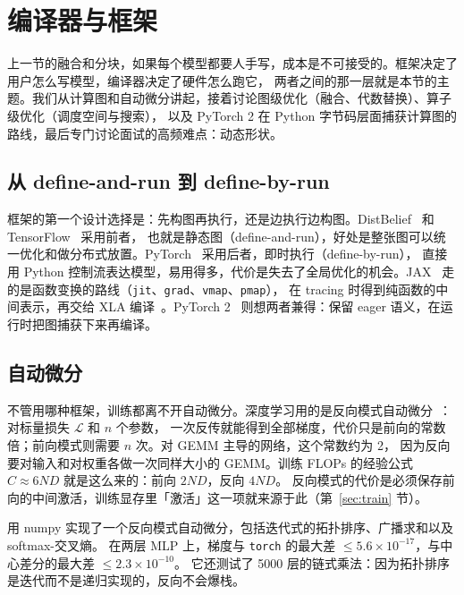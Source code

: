 \section{编译器与框架}
\label{sec:compiler}

上一节的融合和分块，如果每个模型都要人手写，成本是不可接受的。框架决定了用户怎么写模型，编译器决定了硬件怎么跑它，
两者之间的那一层就是本节的主题。我们从计算图和自动微分讲起，接着讨论图级优化（融合、代数替换）、算子级优化（调度空间与搜索），
以及 PyTorch 2 在 Python 字节码层面捕获计算图的路线，最后专门讨论面试的高频难点：动态形状。

\subsection{从 define-and-run 到 define-by-run}

框架的第一个设计选择是：先构图再执行，还是边执行边构图。DistBelief~\cite{dean2012large} 和 TensorFlow~\cite{abadi2016tensorflow} 采用前者，
也就是静态图（define-and-run），好处是整张图可以统一优化和做分布式放置。PyTorch~\cite{paszke2019pytorch} 采用后者，即时执行（define-by-run），
直接用 Python 控制流表达模型，易用得多，代价是失去了全局优化的机会。JAX~\cite{jax2018github} 走的是函数变换的路线（\texttt{jit}、\texttt{grad}、\texttt{vmap}、\texttt{pmap}），
在 tracing 时得到纯函数的中间表示，再交给 XLA 编译~\cite{xla}。PyTorch 2~\cite{ansel2024pytorch2} 则想两者兼得：保留 eager 语义，在运行时把图捕获下来再编译。

\subsection{自动微分}

不管用哪种框架，训练都离不开自动微分。深度学习用的是反向模式自动微分~\cite{baydin2018automatic}：对标量损失 $\mathcal{L}$ 和 $n$ 个参数，
一次反传就能得到全部梯度，代价只是前向的常数倍；前向模式则需要 $n$ 次。对 GEMM 主导的网络，这个常数约为 2，
因为反向要对输入和对权重各做一次同样大小的 GEMM。训练 FLOPs 的经验公式 $C\approx6ND$ 就是这么来的：前向 $2ND$，反向 $4ND$。
反向模式的代价是必须保存前向的中间激活，训练显存里「激活」这一项就来源于此（第~\ref{sec:train} 节）。

用 numpy 实现了一个反向模式自动微分，包括迭代式的拓扑排序、广播求和以及 softmax-交叉熵。
在两层 MLP 上，梯度与 \texttt{torch} 的最大差 $\le5.6\times10^{-17}$，与中心差分的最大差 $\le2.3\times10^{-10}$。
它还测试了 5000 层的链式乘法：因为拓扑排序是迭代而不是递归实现的，反向不会爆栈。

